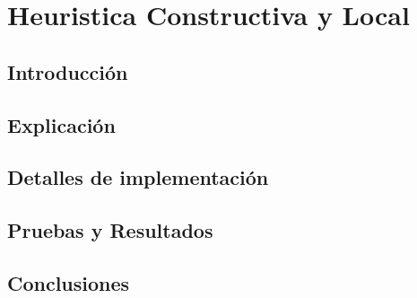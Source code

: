 \section {Heuristica Constructiva y Local}
\subsection{Introducción}


\subsection{Explicación}


\subsection{Detalles de implementación}


\subsection{Pruebas y Resultados}


\subsection{Conclusiones}


